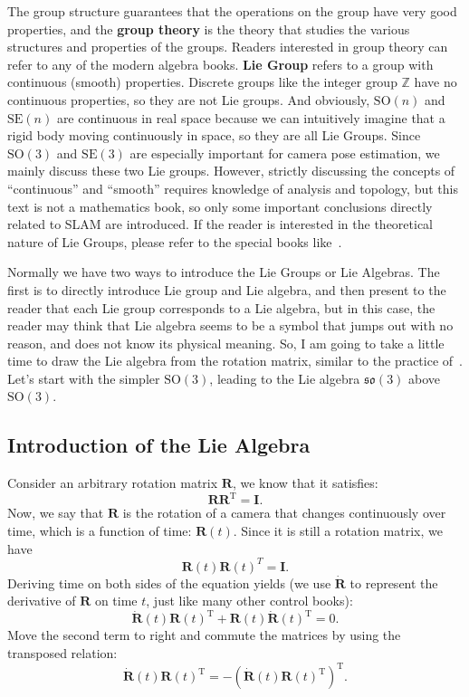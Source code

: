 The group structure guarantees that the operations on the group have very good properties, and the \textbf{group theory} is the theory that studies the various structures and properties of the groups. Readers interested in group theory can refer to any of the modern algebra books. \textbf{Lie Group} refers to a group with continuous (smooth) properties. Discrete groups like the integer group $\mathbb{Z}$ have no continuous properties, so they are not Lie groups. And obviously, $\mathrm{SO}(n)$ and $\mathrm{SE}(n)$ are continuous in real space because we can intuitively imagine that a rigid body moving continuously in space, so they are all Lie Groups. Since $\mathrm{SO}(3)$ and $\mathrm{SE}(3)$ are especially important for camera pose estimation, we mainly discuss these two Lie groups. However, strictly discussing the concepts of ``continuous'' and ``smooth'' requires knowledge of analysis and topology, but this text is not a mathematics book, so only some important conclusions directly related to SLAM are introduced. If the reader is interested in the theoretical nature of Lie Groups, please refer to the special books like~\cite{Varadarajan2013}.

Normally we have two ways to introduce the Lie Groups or Lie Algebras. The first is to directly introduce Lie group and Lie algebra, and then present to the reader that each Lie group corresponds to a Lie algebra, but in this case, the reader may think that Lie algebra seems to be a symbol that jumps out with no reason, and does not know its physical meaning. So, I am going to take a little time to draw the Lie algebra from the rotation matrix, similar to the practice of~\cite{Ma2012}. Let's start with the simpler $\mathrm{SO}(3)$, leading to the Lie algebra $\mathfrak{so}(3)$ above $\mathrm{SO}(3)$.

\subsection{Introduction of the Lie Algebra}
Consider an arbitrary rotation matrix $\mathbf{R}$, we know that it satisfies:
\begin{equation}
\mathbf{R} \mathbf{R}^\mathrm{T}=\mathbf{I}.
\end{equation}
Now, we say that $\mathbf{R}$ is the rotation of a camera that changes continuously over time, which is a function of time: $\mathbf{R}(t)$. Since it is still a rotation matrix, we have
\[
\mathbf{R}(t) \mathbf{R}(t) ^T = \mathbf{I}.
\]
Deriving time on both sides of the equation yields (we use $\dot{\mathbf{R}}$ to represent the derivative of $\mathbf{R}$ on time $t$, just like many other control books):
\[
\dot{\mathbf{R}} (t) \mathbf{R} {(t)^\mathrm{T}} + \mathbf{R} (t) \dot{\mathbf{R}} {(t) ^\mathrm{T}} = 0.
\]
Move the second term to right and commute the matrices by using the transposed relation:
\begin{equation}
\dot{\mathbf{R}} (t) \mathbf{R} {(t)^\mathrm{T}} = - \left( \dot{\mathbf{R}} (t) \mathbf{R} {(t)^\mathrm{T}} \right)^\mathrm{T} .
\end{equation}

